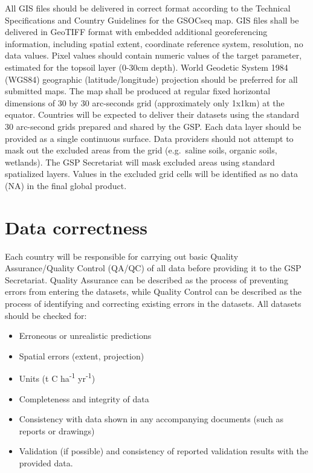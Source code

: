 \documentclass[
  10pt,
  b5paper,
]{book}
\providecommand{\tightlist}{%
  \setlength{\itemsep}{0pt}\setlength{\parskip}{0pt}}
\begin{document}
All GIS files should be delivered in correct format according to the Technical Specifications and Country Guidelines for the GSOCseq map.
GIS files shall be delivered in GeoTIFF format with embedded additional georeferencing information, including spatial extent, coordinate reference system, resolution, no data values. Pixel values should contain numeric values of the target parameter, estimated for the topsoil layer (0-30cm depth).
World Geodetic System 1984 (WGS84) geographic (latitude/longitude) projection should be preferred for all submitted maps. The map shall be produced at regular fixed horizontal dimensions of 30 by 30 arc-seconds grid (approximately only 1x1km) at the equator. Countries will be expected to deliver their datasets using the standard 30 arc-second grids prepared and shared by the GSP.
Each data layer should be provided as a single continuous surface. Data providers should not attempt to mask out the excluded areas from the grid (e.g.~saline soils, organic soils, wetlands). The GSP Secretariat will mask excluded areas using standard spatialized layers. Values in the excluded grid cells will be identified as no data (NA) in the final global product.

\hypertarget{data-correctness}{%
\section{Data correctness}\label{data-correctness}}

Each country will be responsible for carrying out basic Quality Assurance/Quality Control (QA/QC) of all data before providing it to the GSP Secretariat. Quality Assurance can be described as the process of preventing errors from entering the datasets, while Quality Control can be described as the process of identifying and correcting existing errors in the datasets.
All datasets should be checked for:

\begin{itemize}
\tightlist
\item
  Erroneous or unrealistic predictions
\item
  Spatial errors (extent, projection)
\item
  Units (t C ha\textsuperscript{-1} yr\textsuperscript{-1})
\item
  Completeness and integrity of data
\item
  Consistency with data shown in any accompanying documents (such as reports or drawings)
\item
  Validation (if possible) and consistency of reported validation results with the provided data.
\end{itemize}
\end{document}
